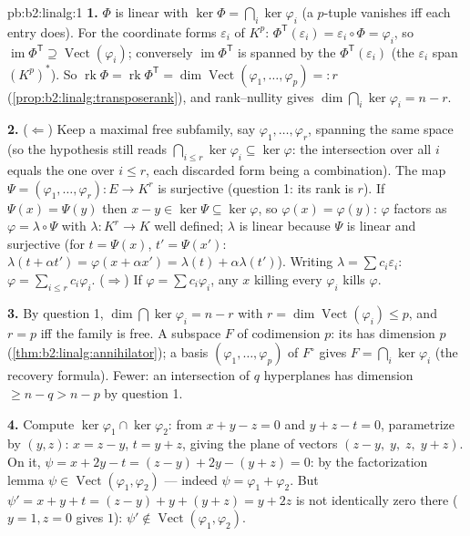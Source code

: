 \begin{solution}{pb:b2:linalg:1}
\textbf{1.} $\Phi$ is linear with $\ker\Phi = \bigcap_i
\ker\varphi_i$ (a $p$-tuple vanishes iff each entry does). For
the coordinate forms $\varepsilon_i$ of $K^p$: $\Phi^{\mathsf
T}(\varepsilon_i) = \varepsilon_i \circ \Phi = \varphi_i$, so
$\operatorname{im}\Phi^{\mathsf T} \supseteq
\operatorname{Vect}(\varphi_i)$; conversely
$\operatorname{im}\Phi^{\mathsf T}$ is spanned by the
$\Phi^{\mathsf T}(\varepsilon_i)$ (the $\varepsilon_i$ span
$(K^p)^*$). So $\operatorname{rk}\Phi = \operatorname{rk}
\Phi^{\mathsf T} = \dim\operatorname{Vect}(\varphi_1, \dots,
\varphi_p) =: r$ (\cref{prop:b2:linalg:transposerank}), and
rank--nullity gives $\dim\bigcap_i\ker\varphi_i = n - r$.

\textbf{2.} ($\Leftarrow$) Keep a maximal free subfamily, say
$\varphi_1, \dots, \varphi_r$, spanning the same space (so the
hypothesis still reads $\bigcap_{i \leq r}\ker\varphi_i \subseteq
\ker\varphi$: the intersection over all $i$ equals the one over
$i \leq r$, each discarded form being a combination). The map
$\Psi = (\varphi_1, \dots, \varphi_r) \colon E \to K^r$ is
surjective (question 1: its rank is $r$). If $\Psi(x) = \Psi(y)$
then $x - y \in \ker\Psi \subseteq \ker\varphi$, so $\varphi(x) =
\varphi(y)$: $\varphi$ factors as $\varphi = \lambda \circ \Psi$
with $\lambda \colon K^r \to K$ well defined; $\lambda$ is linear
because $\Psi$ is linear and surjective (for $t = \Psi(x)$, $t' =
\Psi(x')$: $\lambda(t + \alpha t') = \varphi(x + \alpha x') =
\lambda(t) + \alpha\lambda(t')$). Writing $\lambda = \sum c_i
\varepsilon_i$: $\varphi = \sum_{i \leq r} c_i\varphi_i$.
($\Rightarrow$) If $\varphi = \sum c_i \varphi_i$, any $x$
killing every $\varphi_i$ kills $\varphi$.

\textbf{3.} By question 1, $\dim\bigcap\ker\varphi_i = n - r$
with $r = \dim\operatorname{Vect}(\varphi_i) \leq p$, and $r = p$
iff the family is free. A subspace $F$ of codimension $p$: its
 has dimension $p$
(\cref{thm:b2:linalg:annihilator}); a basis $(\varphi_1, \dots,
\varphi_p)$ of $F^\circ$ gives $F = \bigcap_i\ker\varphi_i$ (the
recovery formula). Fewer: an intersection of $q$ hyperplanes has
dimension $\geq n - q > n - p$ by question 1.

\textbf{4.} Compute $\ker\varphi_1 \cap \ker\varphi_2$: from $x
+ y - z = 0$ and $y + z - t = 0$, parametrize by $(y, z)$: $x = z
- y$, $t = y + z$, giving the plane of vectors $(z - y,\; y,\;
z,\; y + z)$. On it, $\psi = x + 2y - t = (z - y) + 2y - (y + z)
= 0$: by the factorization lemma $\psi \in
\operatorname{Vect}(\varphi_1, \varphi_2)$ --- indeed $\psi =
\varphi_1 + \varphi_2$. But $\psi' = x + y + t = (z - y) + y +
(y + z) = y + 2z$ is not identically zero there ($y = 1, z = 0$
gives $1$): $\psi' \notin \operatorname{Vect}(\varphi_1,
\varphi_2)$.


\end{solution}
